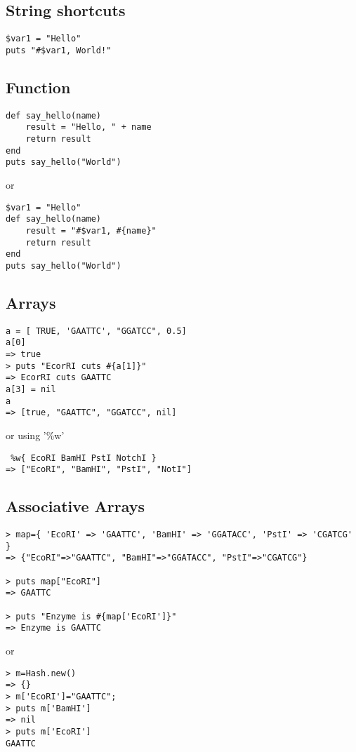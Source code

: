 \documentclass{article}
\begin{document}
\subsection{String shortcuts}
\begin{lstlisting}
$var1 = "Hello"
puts "#$var1, World!"
\end{lstlisting}

\subsection{Function}
\begin{lstlisting}
def say_hello(name)
	result = "Hello, " + name
	return result
end
puts say_hello("World")
\end{lstlisting}
or
\begin{lstlisting}
$var1 = "Hello"
def say_hello(name)
	result = "#$var1, #{name}"
	return result
end
puts say_hello("World")
\end{lstlisting}

\subsection{Arrays}

\begin{lstlisting}
a = [ TRUE, 'GAATTC', "GGATCC", 0.5]
a[0]
=> true
> puts "EcorRI cuts #{a[1]}"
=> EcorRI cuts GAATTC
a[3] = nil
a
=> [true, "GAATTC", "GGATCC", nil]
\end{lstlisting}

or using '\%w'
\begin{lstlisting}
 %w{ EcoRI BamHI PstI NotchI }
=> ["EcoRI", "BamHI", "PstI", "NotI"]
\end{lstlisting}

\subsection{Associative Arrays}
\begin{lstlisting}
> map={ 'EcoRI' => 'GAATTC', 'BamHI' => 'GGATACC', 'PstI' => 'CGATCG' }
=> {"EcoRI"=>"GAATTC", "BamHI"=>"GGATACC", "PstI"=>"CGATCG"}

> puts map["EcoRI"]
=> GAATTC

> puts "Enzyme is #{map['EcoRI']}"
=> Enzyme is GAATTC
\end{lstlisting}

or

\begin{lstlisting}
> m=Hash.new()
=> {}
> m['EcoRI']="GAATTC";
> puts m['BamHI']
=> nil
> puts m['EcoRI']
GAATTC
\end{lstlisting}
\end{document}
